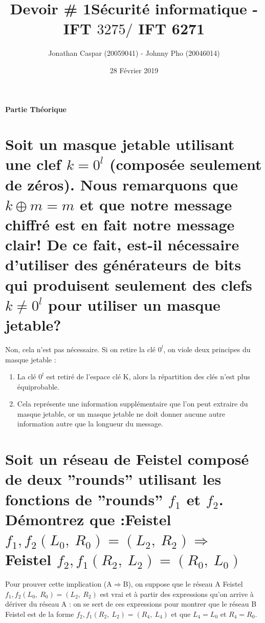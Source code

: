 \documentclass[fleqn]{article}
\title{Devoir \# 1\linebreak S\'{e}curit\'{e} informatique - IFT $3275 /$ IFT 6271}
\author{Jonathan Caspar (20059041) - Johnny Pho (20046014)}
\date{28 Février 2019}
\begin{document}
\maketitle
{\Large\bfseries Partie Théorique\par}

\section{\normalsize Soit un masque jetable utilisant une clef $k = 0^l$
(composée
seulement de zéros). Nous remarquons que $k \oplus m = m$ et que notre
message chiffré est en fait notre message clair! De ce fait, est-il nécessaire
d’utiliser des générateurs de bits qui produisent seulement des clefs $k\neq 0^{l}$
pour utiliser un masque jetable?}

Non, cela n'est pas nécessaire. Si on retire la clé $0^l$, on viole deux principes du masque jetable :

\begin{enumerate}  
\item La clé $0^l$ est retiré de l'espace clé K, alors la répartition des clés n'est plus équiprobable.
\item Cela représente une information supplémentaire que l'on peut extraire du masque jetable, or un masque jetable ne doit donner aucune autre information autre que la longueur du message.
\end{enumerate}

\section{\normalsize Soit un réseau de Feistel composé de deux ''rounds'' utilisant les fonctions de ''rounds'' $f_{1}$ et $f_{2}$. Démontrez que :\linebreak Feistel $f_{1}, f_{2}(L_{0},\ R_{0})=(L_{2},\ R_{2}) \Rightarrow$ Feistel $f_{2}, f_{1}(R_{2},\ L_{2})=(R_{0},\ L_{0})$ }

Pour prouver cette implication (A$\Rightarrow$B), on suppose que le réseau A Feistel $f_{1}, f_{2}(L_{0},\ R_{0})=(L_{2},\ R_{2})$ est vrai et à partir des expressions qu'on arrive à dériver du réseau A : on se sert de ces expressions pour montrer que le réseau B Feistel est de la forme $f_{2}, f_{1}(R_{2},\ L_{2})=(R_{4},\ L_{4})$ et que $L_{4} = L_{0}$ et $R_{4} = R_{0}$.
\end{document}
